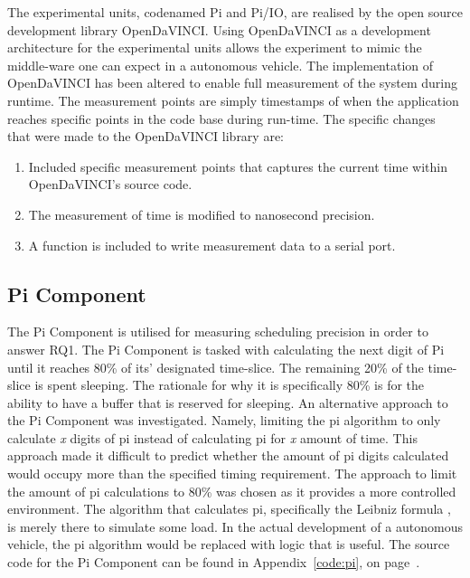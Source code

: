 The experimental units, codenamed Pi and Pi/IO, are realised by the open source development library OpenDaVINCI. Using OpenDaVINCI as a development architecture for the experimental units allows the experiment to mimic the middle-ware one can expect in a autonomous vehicle. The implementation of OpenDaVINCI has been altered to enable full measurement of the system during runtime. The measurement points are simply timestamps of when the application reaches specific points in the code base during run-time. The specific changes that were made to the OpenDaVINCI library are: \\

\begin{enumerate}
\item Included specific measurement points that captures the current time within OpenDaVINCI's source code.
\item The measurement of time is modified to nanosecond precision.
\item A function is included to write measurement data to a serial port.\\
\end{enumerate}


\subsection{Pi Component}
The Pi Component is utilised for measuring scheduling precision in order to answer RQ1. The Pi Component is tasked with calculating the next digit of Pi until it reaches 80\% of its' designated time-slice. The remaining 20\% of the time-slice is spent sleeping. The rationale for why it is specifically 80\% is for the ability to have a buffer that is reserved for sleeping. An alternative approach to the Pi Component was investigated. Namely, limiting the pi algorithm to only calculate \textit{x} digits of pi instead of calculating pi for \textit{x} amount of time. This approach made it difficult to predict whether the amount of pi digits calculated would occupy more than the specified timing requirement. The approach to limit the amount of pi calculations to 80\% was chosen as it provides a more controlled environment. The algorithm that calculates pi, specifically the Leibniz formula \cite{leibniz}, is merely there to simulate some load. In the actual development of a autonomous vehicle, the pi algorithm would be replaced with logic that is useful. The source code for the Pi Component can be found in Appendix~\ref{code:pi}, on page~\pageref{code:pi}.  


